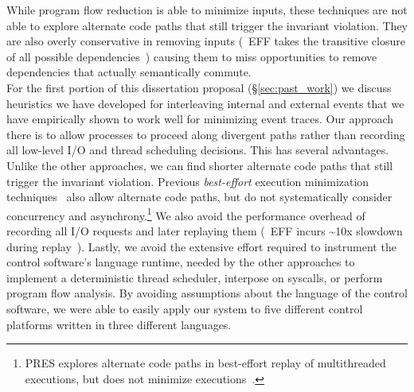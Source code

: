 While program flow reduction is able to minimize inputs,
these techniques are not able to explore alternate code paths that still
trigger the invariant violation. They are also overly conservative in
removing inputs (\eg~EFF takes the transitive closure of all possible
dependencies~\cite{Lee:2011:TGR:1993498.1993528}) causing them to miss opportunities to
remove dependencies that actually semantically commute.\\[0.5ex]
%
 For the first portion of this dissertation proposal (\S\ref{sec:past_work}) we
discuss heuristics we have developed for interleaving internal and external
events that we have empirically shown to work
well for minimizing event traces. Our approach there is
to allow processes to proceed along divergent paths
rather than recording all low-level I/O and thread scheduling decisions.
This has several advantages. Unlike
the other approaches, we can find shorter alternate code paths that still
trigger the invariant violation. Previous {\em best-effort} execution minimization
techniques~\cite{clause2007technique,tucek2007triage} also allow alternate
code paths, but do not systematically
consider concurrency and asynchrony.\footnote{PRES
explores alternate code paths in best-effort replay of multithreaded
executions, but does not minimize executions~\cite{park2009pres}.}
We also avoid the performance overhead of recording all I/O
requests and later replaying them (\eg~EFF incurs \textasciitilde10x slowdown during
replay~\cite{Lee:2011:TGR:1993498.1993528}). Lastly,
we avoid the extensive effort required to instrument the control software's language runtime,
needed by the other approaches to implement a deterministic thread scheduler, interpose on syscalls,
or perform program flow analysis. By avoiding assumptions about the language of the control software,
we were able to easily apply our system to five different control platforms
written in three different languages.

